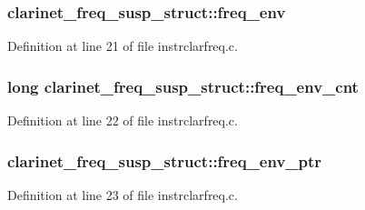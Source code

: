 \subsubsection[{\texorpdfstring{freq\+\_\+env}{freq_env}}]{ clarinet\+\_\+freq\+\_\+susp\+\_\+struct\+::freq\+\_\+env}\hypertarget{structclarinet__freq__susp__struct_af37c1829b5593f7c8a17726d6402bc9d}{}\label{structclarinet__freq__susp__struct_af37c1829b5593f7c8a17726d6402bc9d}


Definition at line 21 of file instrclarfreq.\+c.

\subsubsection[{\texorpdfstring{freq\+\_\+env\+\_\+cnt}{freq_env_cnt}}]{\setlength{\rightskip}{0pt plus 5cm}long clarinet\+\_\+freq\+\_\+susp\+\_\+struct\+::freq\+\_\+env\+\_\+cnt}\hypertarget{structclarinet__freq__susp__struct_ac07046b1f8128f38d1188eda9887a710}{}\label{structclarinet__freq__susp__struct_ac07046b1f8128f38d1188eda9887a710}


Definition at line 22 of file instrclarfreq.\+c.

\subsubsection[{\texorpdfstring{freq\+\_\+env\+\_\+ptr}{freq_env_ptr}}]{ clarinet\+\_\+freq\+\_\+susp\+\_\+struct\+::freq\+\_\+env\+\_\+ptr}\hypertarget{structclarinet__freq__susp__struct_a4f424713c24c3f67db1fe9b25a7ca9dd}{}\label{structclarinet__freq__susp__struct_a4f424713c24c3f67db1fe9b25a7ca9dd}


Definition at line 23 of file instrclarfreq.\+c.

